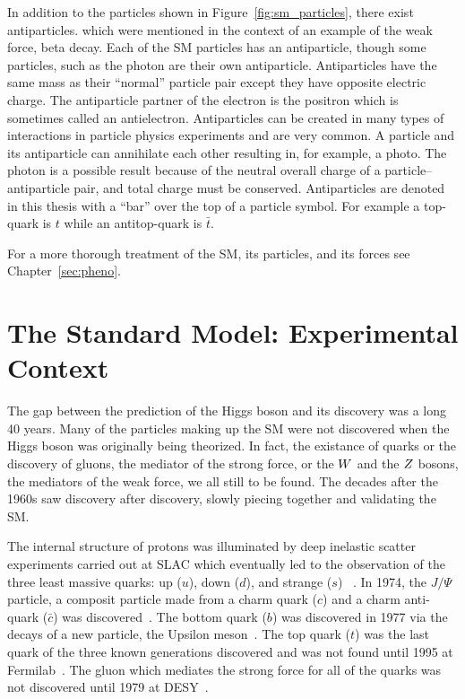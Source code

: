 In addition to the particles shown in Figure~\ref{fig:sm_particles}, there exist antiparticles.
which were mentioned in the context of an example of the weak force, beta decay.
Each of the SM particles has an antiparticle, though some particles, such as the photon
are their own antiparticle. Antiparticles have the same mass as their
``normal'' particle pair except they have opposite electric charge. The antiparticle
partner of the electron is the positron which is sometimes called an antielectron.
Antiparticles can be created in many types of interactions in particle physics experiments
and are very common. A particle and its antiparticle can annihilate each other resulting in,
for example, a photo. The photon is a possible result because of the neutral overall charge
of a particle--antiparticle pair, and total charge must be conserved.
Antiparticles are denoted in this thesis with a ``bar'' over the top of a particle symbol. For example
a top-quark is $t$ while an antitop-quark is $\bar{t}$.

For a more thorough treatment of the SM, its particles, and its forces see
Chapter~\ref{sec:pheno}.



\section{The Standard Model: Experimental Context}
The gap between the prediction of the Higgs boson and its discovery was a long 40 years.
Many of the particles making up the SM were not discovered when the Higgs boson
was originally being theorized. In fact, the existance of quarks or the discovery 
of gluons, the mediator of the strong force, or the $W$ and the $Z$ bosons,
the mediators of the weak force, we all still to be found. The decades after the
1960s saw discovery after discovery, slowly piecing together and validating
the SM.

The internal structure of protons was illuminated by
deep inelastic scatter experiments carried out at SLAC which eventually led to 
the observation of the three least massive quarks: up ($u$), down ($d$), and strange ($s$)
~\cite{PhysRevLett.23.930,Breidenbach:1969kd}. In 1974, the $J/\Psi$ particle, a composit 
particle made from a charm quark ($c$) and a charm anti-quark ($\bar{c}$) was 
discovered~\cite{PhysRevLett.33.1404,PhysRevLett.33.1406}. 
The bottom quark ($b$) was discovered in 1977 via the decays of a new particle, the Upsilon
meson~\cite{PhysRevLett.39.252}. The top quark ($t$) was the last quark of the three
known generations discovered
and was not found until 1995 at Fermilab~\cite{PhysRevLett.74.2626,PhysRevLett.74.2632}.
The gluon which mediates the strong force for all of the quarks was not discovered until 
1979 at DESY~\cite{PhysRevLett.43.830}.

